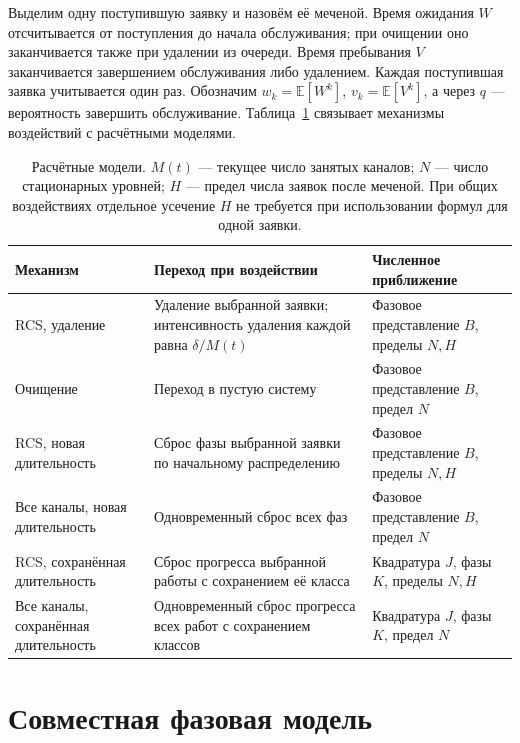 Выделим одну поступившую заявку и назовём её меченой. Время ожидания \(W\) отсчитывается от поступления до начала обслуживания; при очищении оно заканчивается также при удалении из очереди. Время пребывания \(V\) заканчивается завершением обслуживания либо удалением. Каждая поступившая заявка учитывается один раз. Обозначим \(w_k=\mathbb E[W^k]\), \(v_k=\mathbb E[V^k]\), а через \(q\) --- вероятность завершить обслуживание. Таблица~\ref{tab:methods} связывает механизмы воздействий с расчётными моделями.

\begin{table}[!htbp]
\centering\small
\begin{tabular}{@{}p{3.6cm}p{6.0cm}p{5.0cm}@{}}
\toprule
Механизм & Переход при воздействии & Численное приближение \\
\midrule
RCS, удаление & Удаление выбранной заявки; интенсивность удаления каждой равна \(\delta/M(t)\) & Фазовое представление \(B\), пределы \(N,H\) \\
Очищение & Переход в пустую систему & Фазовое представление \(B\), предел \(N\) \\
RCS, новая длительность & Сброс фазы выбранной заявки по начальному распределению & Фазовое представление \(B\), пределы \(N,H\) \\
Все каналы, новая длительность & Одновременный сброс всех фаз & Фазовое представление \(B\), предел \(N\) \\
RCS, сохранённая длительность & Сброс прогресса выбранной работы с сохранением её класса & Квадратура \(J\), фазы \(K\), пределы \(N,H\) \\
Все каналы, сохранённая длительность & Одновременный сброс прогресса всех работ с сохранением классов & Квадратура \(J\), фазы \(K\), предел \(N\) \\
\bottomrule
\end{tabular}
\caption{Расчётные модели. \(M(t)\) --- текущее число занятых каналов; \(N\) --- число стационарных уровней; \(H\) --- предел числа заявок после меченой. При общих воздействиях отдельное усечение \(H\) не требуется при использовании формул для одной заявки.}
\label{tab:methods}
\end{table}

\section{Совместная фазовая модель}
